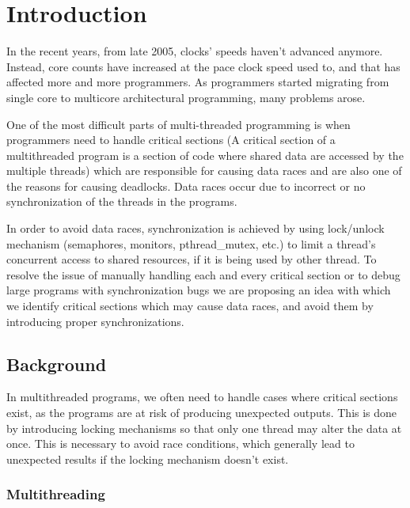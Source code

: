 \chapter{Introduction}

In the recent years, from late 2005, clocks’ speeds haven’t advanced anymore. Instead, core counts have increased at the pace clock speed used to, and that has affected more and more programmers. As programmers started migrating from single core to multicore architectural programming, many problems arose.

One of the most difficult parts of multi-threaded programming is when programmers need to handle critical sections (A critical section of a multithreaded program is a section of code where shared data are accessed by the multiple threads) which are responsible for causing data races and are also one of the reasons for causing deadlocks. Data races occur due to incorrect or no synchronization of the threads in the programs.

In order to avoid data races, synchronization is achieved by using lock/unlock mechanism (semaphores, monitors, pthread\_mutex, etc.) to limit a thread’s concurrent access to shared resources, if it is being used by other thread. To resolve the issue of manually handling each and every critical section or to debug large programs with synchronization bugs we are proposing an idea with which we identify critical sections which may cause data races, and avoid them by introducing proper synchronizations.
\newpage
\section{Background}
In multithreaded programs, we often need to handle cases where critical sections exist, as the programs are at risk of producing unexpected outputs. This is done by introducing locking mechanisms so that only one thread may alter the data at once. This is necessary to avoid race conditions, which generally lead to unexpected results if the locking mechanism doesn't exist.
\subsection{Multithreading}


